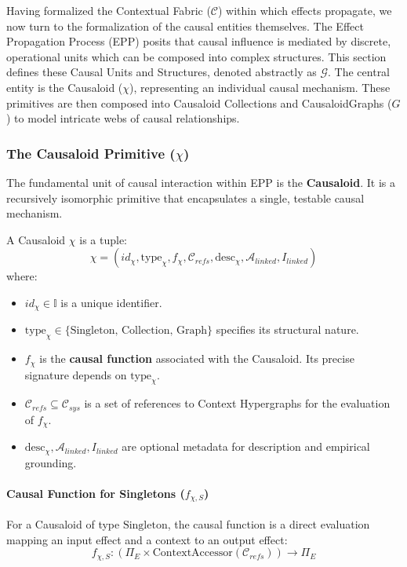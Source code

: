 Having formalized the Contextual Fabric (\(\mathcal{C}\)) within which effects propagate, we now turn to the formalization of the causal entities themselves. The Effect Propagation Process (EPP) posits that causal influence is mediated by discrete, operational units which can be composed into complex structures. This section defines these Causal Units and Structures, denoted abstractly as \(\mathcal{G}\). The central entity is the Causaloid (\(\chi\)), representing an individual causal mechanism. These primitives are then composed into Causaloid Collections and CausaloidGraphs (\(G\)) to model intricate webs of causal relationships.

\newpage

\subsubsection[The Causaloid Primitive (chi)]{The Causaloid Primitive (\(\chi\))}
\label{ssec:causaloid_formal}

The fundamental unit of causal interaction within EPP is the \textbf{Causaloid}. It is a recursively isomorphic primitive that encapsulates a single, testable causal mechanism.

\begin{definition}[Causaloid]
\label{def:causaloid}
A Causaloid \( \chi \) is a tuple:
\[ \chi = (id_\chi, \text{type}_\chi, f_\chi, \mathcal{C}_{refs}, \text{desc}_\chi, \mathcal{A}_{linked}, I_{linked}) \]
where:
\begin{itemize}
    \item \( id_\chi \in \mathbb{I} \) is a unique identifier.
    \item \( \text{type}_\chi \in \{\text{Singleton, Collection, Graph}\} \) specifies its structural nature.
    \item \( f_\chi \) is the \textbf{causal function} associated with the Causaloid. Its precise signature depends on \(\text{type}_\chi\).
    \item \( \mathcal{C}_{refs} \subseteq \mathcal{C}_{sys} \) is a set of references to Context Hypergraphs for the evaluation of \(f_\chi\).
    \item \( \text{desc}_\chi, \mathcal{A}_{linked}, I_{linked} \) are optional metadata for description and empirical grounding.
\end{itemize}
\end{definition}

\paragraph{Causal Function for Singletons (\(f_{\chi,S}\))} For a Causaloid of type \(\text{Singleton}\), the causal function is a direct evaluation mapping an input effect and a context to an output effect:
\[ f_{\chi,S}: (\Pi_E \times \text{ContextAccessor}(\mathcal{C}_{refs})) \to \Pi_E \]


